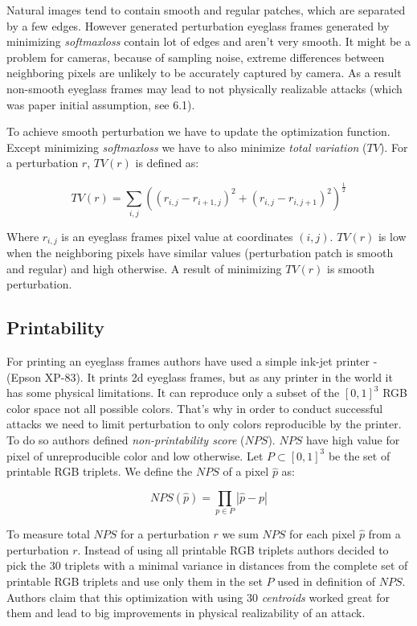 Natural images tend to contain smooth and regular patches, which are separated by a few edges. However generated perturbation eyeglass frames generated by minimizing \textit{softmaxloss} contain lot of edges and aren't very smooth. It might be a problem for cameras, because of sampling noise, extreme differences between neighboring pixels are unlikely to be accurately captured by camera. As a result non-smooth eyeglass frames may lead to not physically realizable attacks (which was paper initial assumption, see 6.1).

To achieve smooth perturbation we have to update the optimization function. Except minimizing \textit{softmaxloss} we have to also minimize \textit{total variation} ($TV$). For a perturbation $r$, $TV(r)$  is defined as: 

\begin{equation}
T V(r)=\sum_{i, j}\left(\left(r_{i, j}-r_{i+1, j}\right)^{2}+\left(r_{i, j}-r_{i, j+1}\right)^{2}\right)^{\frac{1}{2}}
\end{equation}

Where $r_{i,j}$ is an eyeglass frames pixel value at coordinates $(i,j)$. $TV(r)$ is low when the neighboring pixels have similar values (perturbation patch is smooth and regular) and high otherwise. A result of minimizing $TV(r)$ is smooth perturbation.
 
\subsection{Printability}

For printing an eyeglass frames authors have used a simple ink-jet printer - (Epson XP-83). It prints 2d eyeglass frames, but as any printer in the world it has some physical limitations. It can reproduce only a subset of the $[0,1]^3$ RGB color space not all possible colors. That's why in order to conduct successful attacks we need to limit perturbation to only colors reproducible by the printer. To do so authors defined \textit{non-printability score} ($NPS$). $NPS$  have high value for pixel of unreproducible color and low  otherwise. Let $P \subset [0,1]^3 $ be the set of printable RGB triplets. We
define the $NPS$ of a pixel $\hat{p}$ as: 

\begin{equation}
N P S(\hat{p})=\prod_{p \in P}|\hat{p}-p|
\end{equation}

To measure total $NPS$ for a perturbation $r$ we sum $NPS$ for each pixel $\hat{p}$ from a perturbation $r$. Instead of using all printable RGB triplets authors decided to pick the 30 triplets with a minimal variance in distances from the complete set of printable RGB triplets and use only them in the set $P$ used in definition of $NPS$. Authors claim that this optimization with using 30 \textit{centroids} worked great for them and lead to big improvements in physical realizability of an attack.


